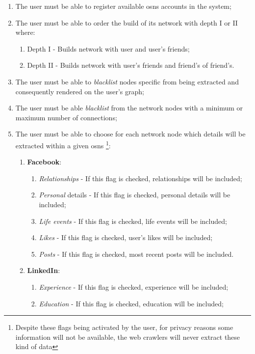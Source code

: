 \begin{enumerate}
    \item The user must be able to register available \glspl{osn} accounts in the system;
    \item The user must be able to order the build of its network with depth I or II where:
    \begin{enumerate}
        \item Depth I - Builds network with user and user's friends;
        \item Depth II - Builds network with user's friends and friend's of friend's.
    \end{enumerate}
    \item The user must be able to \textit{blacklist} nodes specific from being extracted and consequently rendered on the user's graph;
    \item The user must be able \textit{blacklist} from the network nodes with a minimum or maximum number of connections;
    \item The user must be able to choose for each network node which details will be extracted within a given \glspl{osn} \footnote{Despite these flags being activated by the user, for privacy reasons some information will not be available, the web crawlers will never extract these kind of data}:
    \begin{enumerate}
        \item \textbf{Facebook}:
        \begin{enumerate}
            \item \textit{Relationships} - If this flag is checked, relationships will be included;
            \item \textit{Personal} details - If this flag is checked, personal details will be included;
            \item \textit{Life events} - If this flag is checked, life events will be included;
            \item \textit{Likes} - If this flag is checked, user's likes will be included;
            \item \textit{Posts} - If this flag is checked, most recent posts will be included.
        \end{enumerate}
        \item \textbf{LinkedIn}:
        \begin{enumerate}
            \item \textit{Experience} - If this flag is checked, experience will be included;
            \item \textit{Education} - If this flag is checked, education will be included;

\end{enumerate}
\end{enumerate}
\end{enumerate}
